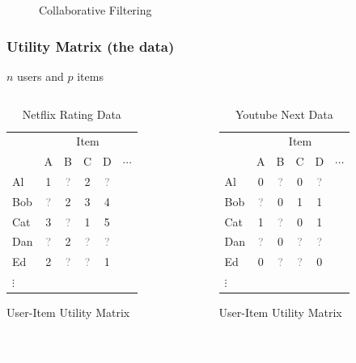 \documentclass[xcolor={dvipsnames}]{beamer}
\begin{document}
\frame
{
\begin{figure}
\Huge
Collaborative Filtering
\end{figure}

}


\frame
{
\frametitle{Utility Matrix (the data)}

$n$ users and $p$ items 

\begin{columns}
\begin{column}{.5\textwidth}

\begin{table}
\begin{tabular}{|l|ccccc|}
\hline
  & \multicolumn{5}{|c|}{Item} \\
    & A & B & C & D & $\cdots$ \\ \hline
Al & 1 & \textcolor{gray}{?} & 2 & \textcolor{gray}{?} &\\
Bob & \textcolor{gray}{?} & 2 & 3 & 4 &\\
Cat & 3 & \textcolor{gray}{?} & 1 & 5&\\
Dan & \textcolor{gray}{?} & 2 & \textcolor{gray}{?} & \textcolor{gray}{?}& \\
Ed & 2 &   \textcolor{gray}{?} & \textcolor{gray}{?} & 1&\\
$\vdots$ &&&&&\\ \hline
\end{tabular}
\caption{Netflix Rating Data}
User-Item Utility Matrix
\end{table}


\end{column}
\begin{column}{.5\textwidth}

\begin{table}
\begin{tabular}{|l|ccccc|}
\hline
  & \multicolumn{5}{|c|}{Item} \\
    & A & B & C & D & $\cdots$ \\ \hline
Al & 0 & \textcolor{gray}{?} & 0 & \textcolor{gray}{?} &\\
Bob & \textcolor{gray}{?} & 0 & 1 & 1 &\\
Cat & 1 & \textcolor{gray}{?} & 0 & 1&\\
Dan & \textcolor{gray}{?} & 0 & \textcolor{gray}{?} & \textcolor{gray}{?}& \\
Ed & 0 &   \textcolor{gray}{?} & \textcolor{gray}{?} & 0 &\\
$\vdots$ &&&&&\\ \hline
\end{tabular}
\caption{Youtube Next Data}
User-Item Utility Matrix
\end{table}


\end{column}
\end{columns}

\Huge
$$\textcolor{white}{O(n\times  n \times p)}$$

}
\end{document}

